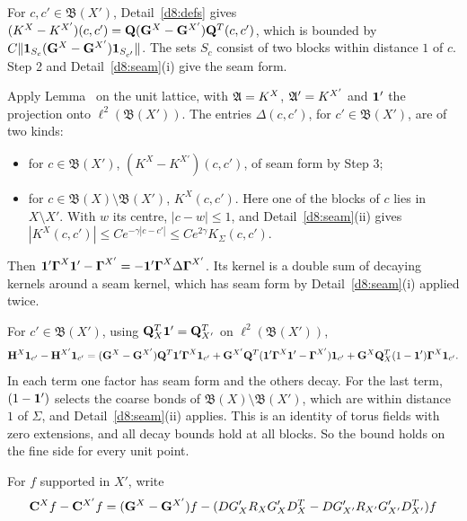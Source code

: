 \begin{detail}
\begin{step}
\end{step}
\begin{step}[$K^X=\bQ_X\bG^X\bQ_X^T$]
For $c,c'\in\mathfrak B(X')$, Detail~\ref{d8:defs} gives $(K^X-K^{X'})(c,c')=\mathbf Q(\mathbf G^X-\mathbf G^{X'})\mathbf Q^T(c,c')$, which is bounded by $C\|\mathbf 1_{S_c}(\mathbf G^X-\mathbf G^{X'})\mathbf 1_{S_{c'}}\|$. The sets $S_c$ consist of two blocks within distance $1$ of $c$. Step 2 and Detail~\ref{d8:seam}(i) give the seam form.
\end{step}
\begin{step}[$\boldsymbol\Gamma$]
Apply Lemma~ on the unit lattice, with $\mathfrak A=K^X$, $\mathfrak A'=K^{X'}$ and $\mathbf 1'$ the projection onto $\ell^2(\mathfrak B(X'))$. The entries $\Delta(c,c')$, for $c'\in\mathfrak B(X')$, are of two kinds:
\begin{itemize}
\item for $c\in\mathfrak B(X')$, $(K^X-K^{X'})(c,c')$, of seam form by Step 3;
\item for $c\in\mathfrak B(X)\setminus\mathfrak B(X')$, $K^X(c,c')$. Here one of the blocks of $c$ lies in $X\setminus X'$. With $w$ its centre, $|c-w|\le1$, and Detail~\ref{d8:seam}(ii) gives $|K^X(c,c')|\le Ce^{-\gamma|c-c'|}\le Ce^{2\gamma}K_\Sigma(c,c')$.
\end{itemize}
Then $\mathbf 1'\boldsymbol\Gamma^X\mathbf 1'-\boldsymbol\Gamma^{X'}=-\mathbf 1'\boldsymbol\Gamma^X\Delta\boldsymbol\Gamma^{X'}$. Its kernel is a double sum of decaying kernels around a seam kernel, which has seam form by Detail~\ref{d8:seam}(i) applied twice.
\end{step}
\begin{step}[$\bH$]
For $c'\in\mathfrak B(X')$, using $\mathbf Q_X^T\mathbf 1'=\mathbf Q_{X'}^T$ on $\ell^2(\mathfrak B(X'))$,
\[
\mathbf H^X\mathbf 1_{c'}-\mathbf H^{X'}\mathbf 1_{c'}=(\mathbf G^X-\mathbf G^{X'})\mathbf Q^T\mathbf 1'\boldsymbol\Gamma^X\mathbf 1_{c'}+\mathbf G^{X'}\mathbf Q^T(\mathbf 1'\boldsymbol\Gamma^X\mathbf 1'-\boldsymbol\Gamma^{X'})\mathbf 1_{c'}+\mathbf G^X\mathbf Q_X^T(1-\mathbf 1')\boldsymbol\Gamma^X\mathbf 1_{c'} .
\]
In each term one factor has seam form and the others decay. For the last term, $(1-\mathbf 1')$ selects the coarse bonds of $\mathfrak B(X)\setminus\mathfrak B(X')$, which are within distance $1$ of $\Sigma$, and Detail~\ref{d8:seam}(ii) applies. This is an identity of torus fields with zero extensions, and all decay bounds hold at all blocks. So the bound holds on the fine side for every unit point. 
\end{step}
\begin{step}[$\bC$]
For $f$ supported in $X'$, write
\[
\begin{aligned}
\bC^Xf-\bC^{X'}f={}&(\bG^X-\bG^{X'})f-(DG'_XR_XG'_XD^T_X-DG'_{X'}R_{X'}G'_{X'}D^T_{X'})f\\

\end{aligned}\]
\end{step}
\end{detail}
